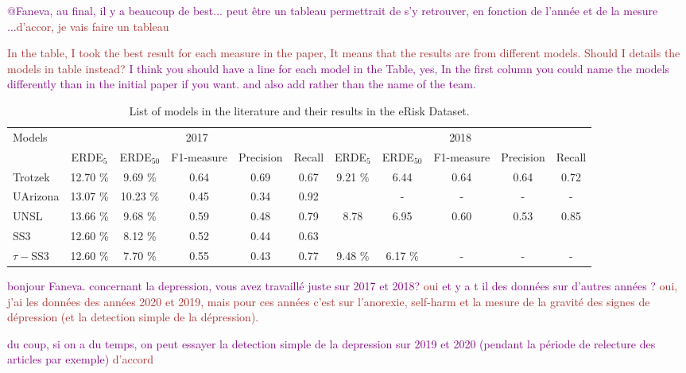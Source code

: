 \documentclass[graybox]{svmult}
\newcommand{\fr}[1]{\textcolor{brown}{#1}}
\newcommand{\jm}[1]{\textcolor{purple}{{  #1}}}
\begin{document}
\jm{@Faneva, au final, il y a beaucoup de best... peut être un tableau permettrait de s'y retrouver, en fonction de l'année et de la mesure ...\fr{d'accor, je vais faire un tableau}}

\fr{In the table, I took the best result for each measure in the paper, It means that the results are from different models. Should I details the models in table instead? \jm{I think you should have a line for each model in the Table, yes, In the first column you could name the models differently than in the initial paper if you want. and also add \cite{} rather than the name of the team. }}
\begin{table}[]
    \centering
    \caption{List of models in the literature and their results in the eRisk Dataset.}
    \label{tab:state_of_art}
    \begin{tabular}{|l|c|c|c|c|c|c|c|c|c|c|}
        \hline
         \multirow{2}{*}{Models}&\multicolumn{5}{c|}{2017} & \multicolumn{5}{c|}{2018} \\
         \cline{2-11}
         & ERDE$_{5}$ & ERDE$_{50}$ & F1-measure & Precision & Recall & ERDE$_{5}$ & ERDE$_{50}$ & F1-measure & Precision & Recall \\
         \hline
        Trotzek & 12.70 \% & 9.69 \% & 0.64 & 0.69 & 0.67& 9.21 \%& 6.44 & 0.64 & 0.64 & 0.72  \\
        UArizona & 13.07 \% & 10.23 \% & 0.45 & 0.34 & 0.92& & - & - & - & - \\
        UNSL & 13.66 \% & 9.68 \% & 0.59 & 0.48 & 0.79& 8.78& 6.95&0.60 & 0.53&  0.85\\\hline
        SS3 & 12.60 \% & 8.12 \% & 0.52 & 0.44 & 0.63& & & & &  \\
        $\tau-$SS3 & 12.60 \% & 7.70 \% & 0.55 & 0.43 & 0.77&9.48 \% & 6.17 \% & - & - & -\\
        \hline
    \end{tabular}
\end{table}

\jm{bonjour Faneva. concernant la depression, vous avez travaillé juste sur 2017 et 2018? \fr{oui}
et y a t il des données sur d'autres années ? \fr{oui, j'ai les données des années 2020 et 2019, mais pour ces années c'est sur l'anorexie, self-harm et la mesure de la gravité des signes de dépression (et la detection simple de la dépression).}}

\jm{du coup, si on a du temps, on peut essayer la detection simple de la depression sur 2019 et 2020 (pendant la période de relecture des articles par exemple) \fr{d'accord}}
\end{document}
